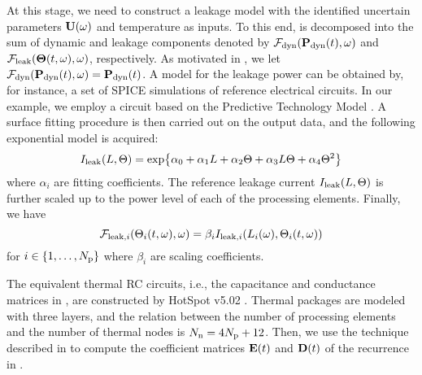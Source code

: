 At this stage, we need to construct a leakage model with the identified uncertain parameters $\mathbf{U}(\omega)$ and temperature as inputs. To this end,  is decomposed into the sum of dynamic and leakage components denoted by $\mathcal{F}_{\text{dyn}}(\mathbf{P}_{\text{dyn}}(t), \omega)$ and $\mathcal{F}_{\text{leak}}({\boldsymbol\Theta}(t, \omega), \omega)$, respectively. As motivated in , we let $\mathcal{F}_{\text{dyn}}(\mathbf{P}_{\text{dyn}}(t), \omega) = \mathbf{P}_{\text{dyn}}(t)$. A model for the leakage power can be obtained by, for instance, a set of SPICE simulations of reference electrical circuits. In our example, we employ a circuit based on the Predictive Technology Model \cite{ptm}. A surface fitting procedure is then carried out on the output data, and the following exponential model is acquired:
\begin{equation} \elabel{leakage-current}
  I_\leak(\Leff, \T) = \text{exp} \big\{ \alpha_0 + \alpha_1 \Leff + \alpha_2 \T + \alpha_3 \Leff \T + \alpha_4 \T^2 \big\}
\end{equation}
where $\alpha_i$ are fitting coefficients. The reference leakage current $I_{\text{leak}}(L, \Theta)$ is further scaled up to the power level of each of the processing elements. Finally, we have
\[
  \mathcal{F}_{\text{leak}, i}(\Theta_i(t, \omega), \omega) = \beta_i I_{\text{leak}, i}(L_i(\omega), \Theta_i(t, \omega))
\]
for $i \in \{ 1, \dotsc, {N_\text{p}} \}$ where $\beta_i$ are scaling coefficients.

The equivalent thermal RC circuits, i.e., the capacitance and conductance matrices in , are constructed by HotSpot v5.02 \cite{hotspot}. Thermal packages are modeled with three layers, and the relation between the number of processing elements and the number of thermal nodes is $N_\text{n} = 4 {N_\text{p}} + 12$. Then, we use the technique described in \cite{ukhov2012} to compute the coefficient matrices $\mE(\t)$ and $\mD(\t)$ of the recurrence in .
